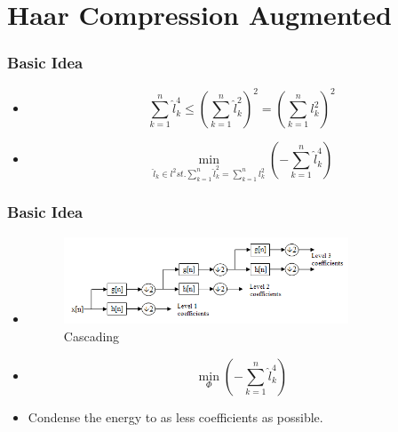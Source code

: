\documentclass{beamer}
\begin{document}
\section{Haar Compression Augmented}
\begin{frame}
    \frametitle{Basic Idea}
    \begin{itemize}
        \item \[
                  \sum_{k=1}^{n}\hat{l}_k^4
                  \leq
                  (\sum_{k=1}^{n}\hat{l}_k^2)^2
                  =
                  (\sum_{k=1}^{n}l_k^2)^2
              \]
        \item \[
                  \min_{\hat{l}_k\in l^2 st. \sum_{k=1}^{n}\hat{l}_k^2=\sum_{k=1}^{n}l_k^2}(-\sum_{k=1}^{n}\hat{l}_k^4)
              \]
    \end{itemize}
\end{frame}
\begin{frame}
    \frametitle{Basic Idea}
    \begin{itemize}
        \item 	\begin{figure}
                  \centering
                  \includegraphics[width=0.8\textwidth]{fig/Wavelets_-_Filter_Bank.png}
                  \caption{Cascading}
                  \label{fig:Cascading}
              \end{figure}
        \item \[
                  \min_{\Phi}(-\sum_{k=1}^{n}\hat{l}_k^4)
              \]
        \item Condense the energy to as less coefficients as possible.
    \end{itemize}
\end{frame}
\end{document}
